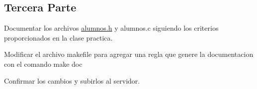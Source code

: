 \subsection*{Tercera Parte}


\begin{DoxyEnumerate}
\item Documentar los archivos {\ttfamily \hyperlink{alumnos_8h}{alumnos.\+h}} y {\ttfamily alumnos.\+c} siguiendo los criterios proporcionados en la clase practica.
\item Modificar el archivo {\ttfamily makefile} para agregar una regla que genere la documentacion con el comando {\ttfamily make doc}
\item Confirmar los cambios y subirlos al servidor. 
\end{DoxyEnumerate}